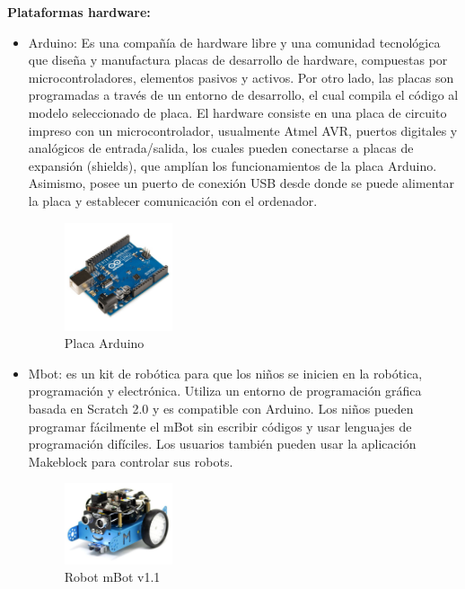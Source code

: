 \textbf{Plataformas hardware:} 
\begin{itemize}
	\item Arduino: Es una compañía de hardware libre y una comunidad tecnológica que diseña y manufactura placas de desarrollo de hardware, compuestas por microcontroladores, elementos pasivos y activos. Por otro lado, las placas son programadas a través de un entorno de desarrollo, el cual compila el código al modelo seleccionado de placa. El hardware consiste en una placa de circuito impreso con un microcontrolador, usualmente Atmel AVR, puertos digitales y analógicos de entrada/salida,  los cuales pueden conectarse a placas de expansión (shields), que amplían los funcionamientos de la placa Arduino. Asimismo, posee un puerto de conexión USB desde donde se puede alimentar la placa y establecer comunicación con el ordenador.
	
	\begin{figure}[H]
  	  \begin{center}
    	\includegraphics[width=0.3\textwidth]{figures/Introduccion/arduino.jpg}
			\caption{Placa Arduino}
			\label{fig.arduino}
	  		\end{center}
	\end{figure}
	
	\item Mbot: es un kit de robótica para que los niños se inicien en la robótica, programación y electrónica. Utiliza un  entorno de programación gráfica basada en Scratch 2.0
y es compatible con Arduino. Los niños pueden programar fácilmente el mBot sin escribir códigos y usar lenguajes de programación difíciles. Los usuarios también pueden usar la aplicación Makeblock para controlar sus robots.
	\begin{figure}[H]
  	  \begin{center}
    	\includegraphics[width=0.3\textwidth]{figures/Introduccion/mbot.jpg}
			\caption{Robot mBot v1.1}
			\label{fig.mbot}
	  		\end{center}
	\end{figure}
\end{itemize}

